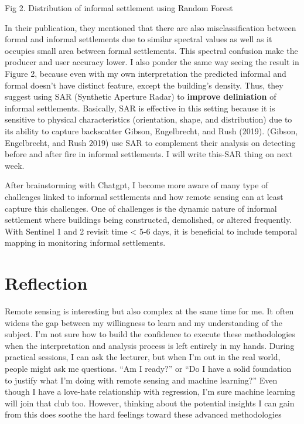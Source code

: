 \documentclass[
  letterpaper,
  DIV=11,
  numbers=noendperiod]{scrreprt}
\begin{document}
Fig 2. Distribution of informal settlement using Random Forest

In their publication, they mentioned that there are also
misclassification between formal and informal settlements due to similar
spectral values as well as it occupies small area between formal
settlements. This spectral confusion make the producer and user accuracy
lower. I also ponder the same way seeing the result in Figure 2, because
even with my own interpretation the predicted informal and formal
doesn't have distinct feature, except the building's density. Thus, they
suggest using SAR (Synthetic Aperture Radar) to \textbf{improve
deliniation} of informal settlements. Basically, SAR is effective in
this setting because it is sensitive to physical characteristics
(orientation, shape, and distribution) due to its ability to capture
backscatter Gibson, Engelbrecht, and Rush (2019). (Gibson, Engelbrecht,
and Rush 2019) use SAR to complement their analysis on detecting before
and after fire in informal settlements. I will write this-SAR thing on
next week.

After brainstorming with Chatgpt, I become more aware of many type of
challenges linked to informal settlements and how remote sensing can at
least capture this challenges. One of challenges is the dynamic nature
of informal settlement where buildings being constructed, demolished, or
altered frequently. With Sentinel 1 and 2 revisit time \textless{} 5-6
days, it is beneficial to include temporal mapping in monitoring
informal settlements.

\hypertarget{reflection-4}{%
\section{Reflection}\label{reflection-4}}

Remote sensing is interesting but also complex at the same time for me.
It often widens the gap between my willingness to learn and my
understanding of the subject. I'm not sure how to build the confidence
to execute these methodologies when the interpretation and analysis
process is left entirely in my hands. During practical sessions, I can
ask the lecturer, but when I'm out in the real world, people might ask
me questions. ``Am I ready?'' or ``Do I have a solid foundation to
justify what I'm doing with remote sensing and machine learning?'' Even
though I have a love-hate relationship with regression, I'm sure machine
learning will join that club too. However, thinking about the potential
insights I can gain from this does soothe the hard feelings toward these
advanced methodologies
\end{document}
